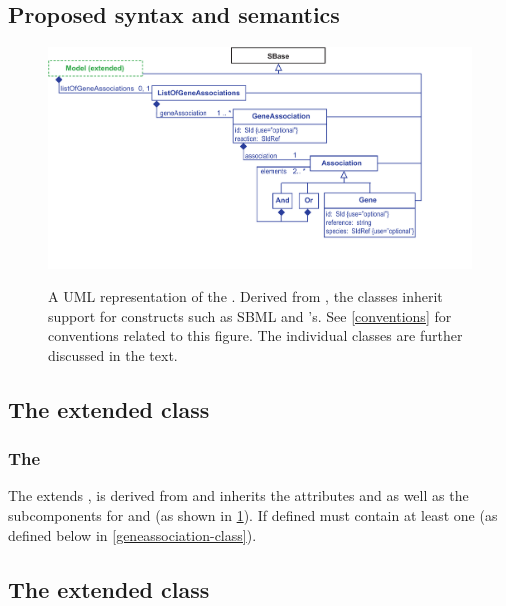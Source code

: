 \pagebreak
\subsection{Proposed syntax and semantics}
\label{syntax-ga}

\begin{figure}[h!]
  \centering
  \includegraphics[width=\textwidth]{images/fbc_uml_ga_all.pdf}\\
  \caption{A UML representation of the \FBCPackage. Derived from \SBase, the \FBC classes inherit support for constructs such as SBML \Notes and \Annotation's. See \ref{conventions} for conventions related to this figure. The individual classes are further discussed in the text.}
  \label{fig:fbc_uml_ga_all}
\end{figure}

\subsection{The extended  class}
\label{listofgeneassociations-class}


\subsubsection{The \FBC {}}

The \ListOfGeneAssociations extends \sbmlthreecore, is derived from \SBase and inherits the attributes  and  as well as the subcomponents for \Annotation and \Notes (as shown in \ref{fig:fbc_uml_ga_all}). If defined \ListOfGeneAssociations must contain at least one \GeneAssociation (as defined below in \ref{geneassociation-class}).

\subsection{The extended  class}
\label{species-class-ga}

